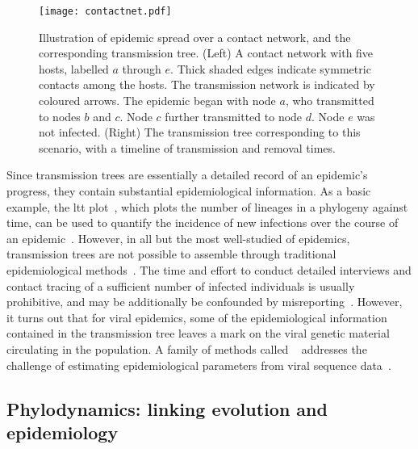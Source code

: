 \begin{figure}
    \centering
    \texttt{[image: contactnet.pdf]}
    \caption[Illustration of a contact network and transmission tree.]{
      Illustration of epidemic spread over a contact network, and the
      corresponding transmission tree. (Left) A contact network with five
      hosts, labelled $a$ through $e$. Thick shaded edges indicate symmetric
      contacts among the hosts. The transmission network is indicated by
      coloured arrows. The epidemic began with node $a$, who transmitted to
      nodes $b$ and $c$. Node $c$ further transmitted to node $d$. Node $e$ was
      not infected. (Right) The transmission tree corresponding to this
      scenario, with a timeline of transmission and removal times.
    }
    \label{fig:contactnet}
\end{figure}

Since transmission trees are essentially a detailed record of an epidemic's
progress, they contain substantial epidemiological information. As a basic
example, the \gls{ltt} plot~\autocite{nee1992tempo}, which plots the number of
lineages in a phylogeny against time, can be used to quantify the incidence of
new infections over the course of an epidemic~\autocite{holmes1995revealing}.
However, in all but the most well-studied of epidemics, transmission trees are
not possible to assemble through traditional epidemiological
methods~\autocite{welch2011statistical}. The time and effort to conduct
detailed interviews and contact tracing of a sufficient number of infected
individuals is usually prohibitive, and may be additionally be confounded by
misreporting~\autocite{eames2015six}. However, it turns out that for viral
epidemics, some of the epidemiological information contained in the
transmission tree leaves a mark on the viral genetic material circulating in
the population. A family of methods called
~\autocite{grenfell2004unifying} addresses the challenge of
estimating epidemiological parameters from viral sequence
data~\autocite{volz2013viral}.

\subsection{Phylodynamics: linking evolution and epidemiology}


